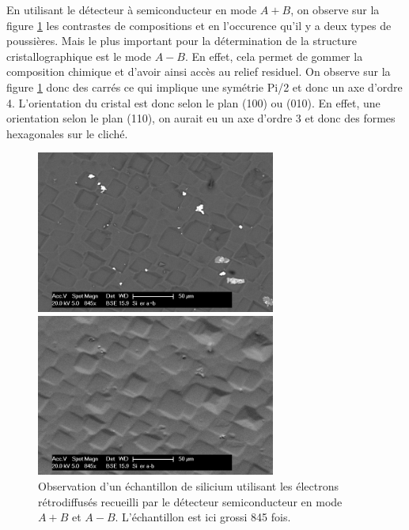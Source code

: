 \documentclass[a4paper,12pt]{article}
\begin{document}
En utilisant le détecteur à semiconducteur en mode $A+B$, on observe sur la figure \ref{fig:si_er_apb_amb} les contrastes de compositions et en l'occurence qu'il y a deux types de poussières. Mais le plus important pour la détermination de la structure cristallographique est le mode $A-B$. En effet, cela permet de gommer la composition chimique et d'avoir ainsi accès au relief residuel. On observe sur la figure \ref{fig:si_er_apb_amb} donc des carrés ce qui implique une symétrie Pi/2 et donc un axe d'ordre 4. L'orientation du cristal est donc selon le plan (100) ou (010). En effet, une orientation selon le plan (110), on aurait eu un axe d'ordre 3 et donc des formes hexagonales sur le cliché.
\begin{figure}
\begin{minipage}[c]{.55\linewidth}
\centering
\includegraphics[width=0.7\textwidth]{images/si_er_apb.png}
 \end{minipage}\hfill
\begin{minipage}[c]{.55\linewidth}
\centering
\includegraphics[width=0.7\textwidth]{images/si_er_amb.png}
\end{minipage}
\caption{Observation d'un échantillon de silicium utilisant les électrons rétrodiffusés recueilli par le détecteur semiconducteur en mode $A+B$ et $A-B$. L'échantillon est ici grossi 845 fois.}
\label{fig:si_er_apb_amb}
\end{figure}
\end{document}
